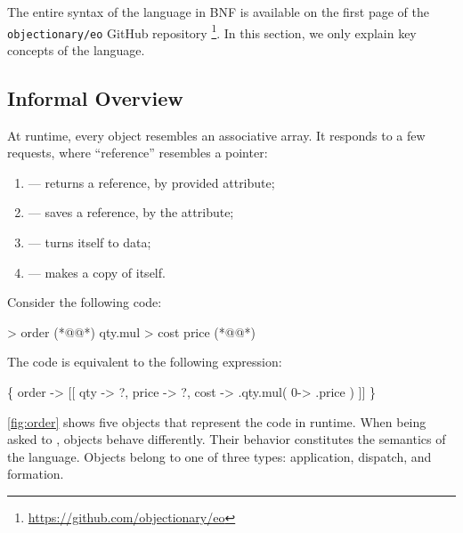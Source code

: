 


The entire syntax of the \eolang{} language in BNF is available on the first page of the \texttt{objectionary/eo} GitHub repository%
  \footnote{\url{https://github.com/objectionary/eo}}.
In this section, we only explain key concepts of the language.

\subsection{Informal Overview}

At runtime, every \eolang{} object resembles an associative array.
It responds to a few requests, where ``reference'' resembles a pointer:
\begin{enumerate}
  \item {} --- returns a reference, by provided attribute;
  \item {} --- saves a reference, by the attribute;
  \item {} --- turns itself to data;
  \item {} --- makes a copy of itself.
\end{enumerate}

Consider the following code:

\begin{ffcode}
 > order (*@\label{ln:order-start}@*)
  qty.mul > cost
    price (*@\label{ln:order-stop}@*)
\end{ffcode}

The code is equivalent to the following \phic{} expression:
\begin{phiquation*}
\Big\{ order -> [[ qty -> ?, price -> ?, cost -> \xi.qty.mul( 0-> \xi.price ) ]] \Big\}
\end{phiquation*}

\cref{fig:order} shows five objects that represent the code in runtime.
When being asked to , objects behave differently.
Their behavior constitutes the semantics of the language.
Objects belong to one of three types: application, dispatch, and formation.

